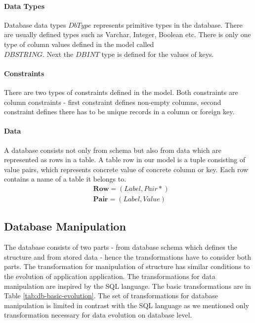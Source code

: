 \documentclass[runningheads]{comsis}
\begin{document}
\paragraph{Data Types} Database data types $DbType$ represents primitive types in the database. There are usually defined types such as Varchar, Integer, Boolean etc. There is only one type of column values defined in the model called \\ $DBSTRING$. Next the $DBINT$ type is defined for the values of keys.

\paragraph{Constraints} There are two types of constraints defined in the model. Both constraints are column constraints - first constraint defines non-empty columns, second constraint defines there has to be unique records in a column or foreign key.

\paragraph{Data} A database consists not only from schema but also from data which are represented as rows in a table. A table row in our model is a tuple consisting of value pairs, which represents concrete value of concrete column or key. Each row contains a name of a table it belongs to.
\begin{align}
&	\mathbf{Row} = (Label, Pair*) \\
&	\mathbf{Pair} = (Label, Value) 
\end{align}


\subsection{Database Manipulation}
\label{sec:db-evolution}
The database consists of two parts - from database schema which defines the structure and from stored data - hence the transformations have to consider both parts. The transformation for manipulation of structure has similar conditions to the evolution of application application. The transformations for data manipulation are inspired by the SQL language. The basic transformations are in Table \ref{tab:db-basic-evolution}. The set of transformations for database manipulation is limited in contrast with the SQL language as we mentioned only transformation necessary for data evolution on database level. 
\end{document}
